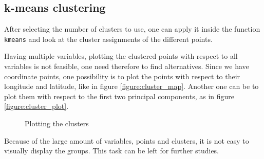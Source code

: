 \subsection{k-means clustering}\label{subsec:kmeans}

After selecting the number of clusters to use, one can apply it inside the function \texttt{kmeans} and look at the cluster assignments of the different points.

Having multiple variables, plotting the clustered points with respect to all variables is not feasible, one need therefore to find alternatives. Since we have coordinate points, one possibility is to plot the points with respect to their longitude and latitude, like in figure \ref{figure:cluster_map}. Another one can be to plot them with respect to the first two principal components, as in figure \ref{figure:cluster_plot}.

\begin{figure}[H]
\centering
{}
\caption{Plotting the clusters}
\centering
\end{figure}

Because of the large amount of variables, points and clusters, it is not easy to visually display the groups. This task can be left for further studies.
